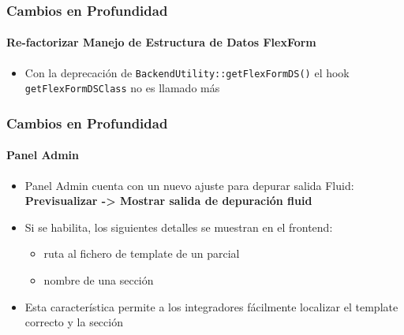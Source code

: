 \begin{frame}[fragile]
	\frametitle{Cambios en Profundidad}
	\framesubtitle{Re-factorizar Manejo de Estructura de Datos FlexForm}


	\begin{itemize}
		\item Con la deprecación de \texttt{BackendUtility::getFlexFormDS()} el hook
			\texttt{getFlexFormDSClass} no es llamado más

	\end{itemize}

\end{frame}





\begin{frame}[fragile]
	\frametitle{Cambios en Profundidad}
	\framesubtitle{Panel Admin}

	\begin{itemize}
		\item Panel Admin cuenta con un nuevo ajuste para depurar salida Fluid:\newline
			\textbf{Previsualizar -> Mostrar salida de depuración fluid}
		\item Si se habilita, los siguientes detalles se muestran en el frontend:

			\begin{itemize}
				\item ruta al fichero de template de un parcial
				\item nombre de una sección
			\end{itemize}

		\item Esta característica permite a los integradores fácilmente localizar el template correcto y la sección

	\end{itemize}

\end{frame}






